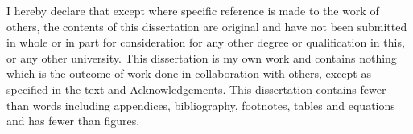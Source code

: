 
\begin{declaration}

I hereby declare that except where specific reference is made to the work of 
others, the contents of this dissertation are original and have not been 
submitted in whole or in part for consideration for any other degree or 
qualification in this, or any other university. This dissertation is my own 
work and contains nothing which is the outcome of work done in collaboration 
with others, except as specified in the text and Acknowledgements. This 
dissertation contains fewer than  words including appendices, 
bibliography, footnotes, tables and equations and has fewer than  figures.


\end{declaration}

